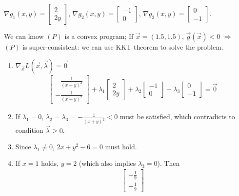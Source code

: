 \documentclass[11pt,a4paper]{article}
\begin{document}
$\nabla g_1(x,y)=\begin{bmatrix}
    2\\2y
\end{bmatrix}$, $\nabla g_2(x,y)=\begin{bmatrix}
    -1\\0
\end{bmatrix}$, $\nabla g_3(x,y)=\begin{bmatrix}
    0\\-1
\end{bmatrix}$.

We can know $(P)$ is a convex program; If $\vec{x}=(1.5,1.5)$, $\vec{g}(\vec{x})<0$ $\Rightarrow$ $(P)$ is super-consistent: we can use KKT theorem to solve the problem.
\begin{enumerate}[$\bullet$]
    \item $\nabla_{\vec{x}} L(\vec{x},\vec{\lambda})=\vec{0}$
    \begin{equation}
        \begin{aligned}
            \begin{bmatrix}
                -\frac{1}{(x+y)^2}\\-\frac{1}{(x+y)^2}
            \end{bmatrix}+\lambda_1 \begin{bmatrix}
                2\\2y
            \end{bmatrix}+ \lambda_2 \begin{bmatrix}
                -1\\0
            \end{bmatrix}+ \lambda_3 \begin{bmatrix}
                0\\-1
            \end{bmatrix}=\vec{0}
        \end{aligned}
        \nonumber
    \end{equation}
    \item If $\lambda_1=0$, $\lambda_2=\lambda_3=-\frac{1}{(x+y)^2}<0$ must be satisfied, which contradicts to condition $\vec{\lambda}\geq 0$.
    \item Since $\lambda_1\neq 0$, $2x+y^2-6=0$ must hold.
    \item If $x=1$ holds, $y=2$ (which also implies $\lambda_3=0$). Then
    \begin{equation}
        \begin{aligned}
            \begin{bmatrix}
                -\frac{1}{9}\\-\frac{1}{9}

\end{bmatrix}
\end{aligned}
\end{equation}
\end{enumerate}
\end{document}

